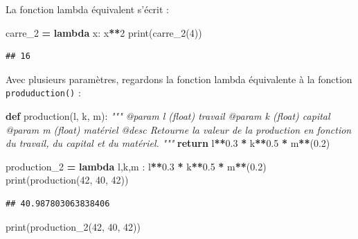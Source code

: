 \documentclass[12pt,]{book}
\newenvironment{Shaded}{\begin{snugshade}}{\end{snugshade}}
\newcommand{\KeywordTok}[1]{\textcolor[rgb]{0.13,0.29,0.53}{\textbf{#1}}}
\newcommand{\DecValTok}[1]{\textcolor[rgb]{0.00,0.00,0.81}{#1}}
\newcommand{\FloatTok}[1]{\textcolor[rgb]{0.00,0.00,0.81}{#1}}
\newcommand{\CommentTok}[1]{\textcolor[rgb]{0.56,0.35,0.01}{\textit{#1}}}
\newcommand{\ControlFlowTok}[1]{\textcolor[rgb]{0.13,0.29,0.53}{\textbf{#1}}}
\newcommand{\OperatorTok}[1]{\textcolor[rgb]{0.81,0.36,0.00}{\textbf{#1}}}
\newcommand{\BuiltInTok}[1]{#1}
\newcommand{\NormalTok}[1]{#1}
\numberwithin{equation}{section}
\numberwithin{countremarque}{section}
\begin{document}
La fonction lambda équivalent s'écrit :

\begin{Shaded}
\begin{Highlighting}[]
\NormalTok{carre_2 }\OperatorTok{=} \KeywordTok{lambda}\NormalTok{ x: x}\OperatorTok{**}\DecValTok{2}
\BuiltInTok{print}\NormalTok{(carre_2(}\DecValTok{4}\NormalTok{))}
\end{Highlighting}
\end{Shaded}

\begin{lstlisting}
## 16
\end{lstlisting}

Avec plusieurs paramètres, regardons la fonction lambda équivalente à la
fonction \texttt{produduction()} :

\begin{Shaded}
\begin{Highlighting}[]
\KeywordTok{def}\NormalTok{ production(l, k, m):}
  \CommentTok{"""}
\CommentTok{  @param l (float) travail}
\CommentTok{  @param k (float) capital}
\CommentTok{  @param m (float) matériel}
\CommentTok{  @desc Retourne la valeur de la production en fonction}
\CommentTok{    du travail, du capital et du matériel.}
\CommentTok{  """}
  \ControlFlowTok{return}\NormalTok{ l}\OperatorTok{**}\FloatTok{0.3} \OperatorTok{*}\NormalTok{ k}\OperatorTok{**}\FloatTok{0.5} \OperatorTok{*}\NormalTok{ m}\OperatorTok{**}\NormalTok{(}\FloatTok{0.2}\NormalTok{)}
\end{Highlighting}
\end{Shaded}

\begin{Shaded}
\begin{Highlighting}[]
\NormalTok{production_2 }\OperatorTok{=} \KeywordTok{lambda}\NormalTok{ l,k,m : l}\OperatorTok{**}\FloatTok{0.3} \OperatorTok{*}\NormalTok{ k}\OperatorTok{**}\FloatTok{0.5} \OperatorTok{*}\NormalTok{ m}\OperatorTok{**}\NormalTok{(}\FloatTok{0.2}\NormalTok{)}
\BuiltInTok{print}\NormalTok{(production(}\DecValTok{42}\NormalTok{, }\DecValTok{40}\NormalTok{, }\DecValTok{42}\NormalTok{))}
\end{Highlighting}
\end{Shaded}

\begin{lstlisting}
## 40.987803063838406
\end{lstlisting}

\begin{Shaded}
\begin{Highlighting}[]
\BuiltInTok{print}\NormalTok{(production_2(}\DecValTok{42}\NormalTok{, }\DecValTok{40}\NormalTok{, }\DecValTok{42}\NormalTok{))}
\end{Highlighting}
\end{Shaded}
\end{document}
